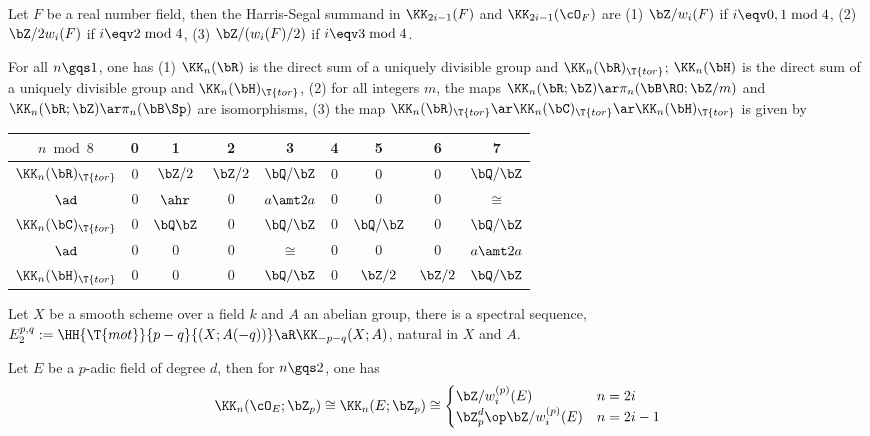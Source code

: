 \documentclass[article, a4paper, twoside]{universal}
\begin{document}
\begin{thm}[\Rnum{6}.2.6]
    Let $F$ be a real number field, then the Harris-Segal summand in $\KK_{2i-1}(F)$ and $\KK_{2i-1}(\cO_{F})$ are (1) $\bZ/w_{i}(F)$ if $i\eqv0,1\bmod{4}$, (2) $\bZ/2w_{i}(F)$ if $i\eqv2\bmod{4}$, (3) $\bZ/(w_{i}(F)/2)$ if $i\eqv3\bmod{4}$.
\end{thm}

\begin{thm}
    For all $n\gqs1$, one has (1) $\KK_{n}(\bR)$ is the direct sum of a uniquely divisible group and $\KK_{n}(\bR)_{\T{tor}}$; $\KK_{n}(\bH)$ is the direct sum of a uniquely divisible group and $\KK_{n}(\bH)_{\T{tor}}$, (2) for all integers $m$, the maps $\KK_{n}(\bR;\bZ)\ar\pi_{n}(\bB\RO;\bZ/m)$ and $\KK_{n}(\bR;\bZ)\ar\pi_{n}(\bB\Sp)$ are isomorphisms, (3) the map $\KK_{n}(\bR)_{\T{tor}}\ar\KK_{n}(\bC)_{\T{tor}}\ar\KK_{n}(\bH)_{\T{tor}}$ is given by
\begin{table}[H]
    \centering
    \begin{tabular}{c|c|c|c|c|c|c|c|c}
      \toprule
        $n\bmod 8$ &0&1&2&3&4&5&6&7 \\
      \midrule
        $\KK_{n}(\bR)_{\T{tor}}$ & 0 & $\bZ/2$  & $\bZ/2$ & $\bQ/\bZ$ & 0 & 0         & 0       & $\bQ/\bZ$ \\
        $\ad$         & 0 &  $\ahr$  & 0       &   $a\amt 2a$  & 0 & 0         & 0       &   $\cong$    \\
        $\KK_{n}(\bC)_{\T{tor}}$ & 0 & $\bQ\bZ$ & 0       & $\bQ/\bZ$ & 0 & $\bQ/\bZ$ & 0       & $\bQ/\bZ$ \\
        $\ad$         & 0 & 0        & 0       &     $\cong$    & 0 & 0         & 0       &    $a\amt 2a$   \\
        $\KK_{n}(\bH)_{\T{tor}}$ & 0 & 0        & 0       & $\bQ/\bZ$ & 0 & $\bZ/2$   & $\bZ/2$ & $\bQ/\bZ$ \\
      \bottomrule
    \end{tabular}
\end{table}
\end{thm}

\begin{thm}
    Let $X$ be a smooth scheme over a field $k$ and $A$ an abelian group, there is a spectral sequence, $E_{2}^{p,q}:=\HH{\T{mot}}{p-q}{(X;A(-q))}\aR\KK_{-p-q}(X;A)$, natural in $X$ and $A$.
\end{thm}

\begin{thm}
    Let $E$ be a $p$-adic field of degree $d$, then for $n\gqs2$, one has
    \[
        \KK_{n}(\cO_{E};\bZ_{p})\cong \KK_{n}(E;\bZ_{p})\cong \begin{cases}
          \bZ/w_{i}^{(p)}(E) & n = 2i \\
          \bZ_{p}^{d}\op\bZ/w_{i}^{(p)}(E) & n = 2i - 1
        \end{cases}
    \]
\end{thm}
\end{document}
